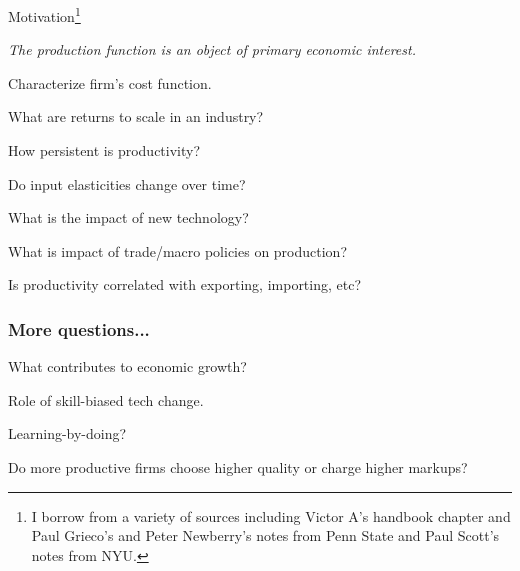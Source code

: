 \documentclass[11pt, aspectratio=169]{beamer}
\newcommand{\Skip}{\vspace{1em}}
\newenvironment{wideitemize}{\itemize\addtolength{\itemsep}{10pt}}{\enditemize}
\begin{document}
\begin{frame}{Motivation\footnote{I borrow from a variety of sources including Victor A's handbook chapter and Paul Grieco's and Peter Newberry's notes from Penn State and Paul Scott's notes from NYU.}}

\emph{The production function is an object of primary economic interest.}

\Skip
\begin{wideitemize}
	\item Characterize firm's cost function.
	\item What are returns to scale in an industry? 
	\item How persistent is productivity?
	\item Do input elasticities change over time?
	\item What is the impact of new technology?
	\item What is impact of trade/macro policies on production?
	\item Is productivity correlated with exporting, importing, etc?
\end{wideitemize}

\end{frame}


\begin{frame}[c]\frametitle{More questions...}

\begin{wideitemize}
	\item What contributes to economic growth?
	\item Role of skill-biased tech change. 
	\item Learning-by-doing?
	\item Do more productive firms choose higher quality or charge higher markups?
\end{wideitemize}
    


\end{frame}
\end{document}
